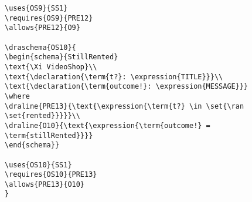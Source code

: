 \begin{verbatim}
\uses{OS9}{SS1}
\requires{OS9}{PRE12}
\allows{PRE12}{O9}

\draschema{OS10}{
\begin{schema}{StillRented}
\text{\Xi VideoShop}\\
\text{\declaration{\term{t?}: \expression{TITLE}}}\\
\text{\declaration{\term{outcome!}: \expression{MESSAGE}}}
\where
\draline{PRE13}{\text{\expression{\term{t?} \in \set{\ran \set{rented}}}}}\\
\draline{O10}{\text{\expression{\term{outcome!} = \term{stillRented}}}}
\end{schema}}

\uses{OS10}{SS1}
\requires{OS10}{PRE13}
\allows{PRE13}{O10}
}


\end{verbatim}